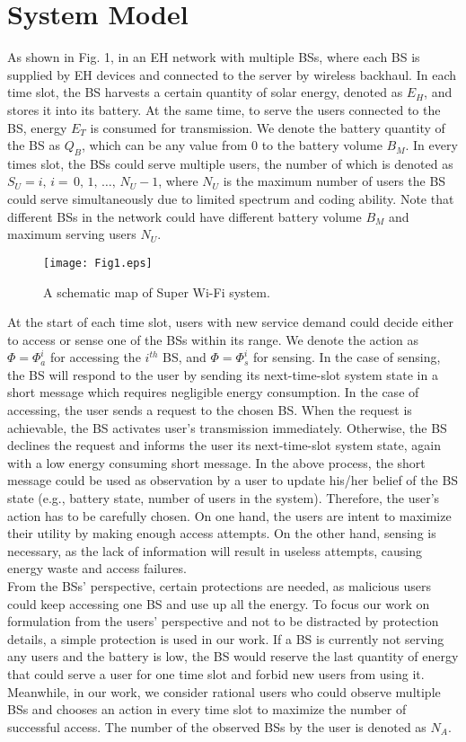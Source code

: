 \documentclass[journal,12pt,draftclsnofoot,onecolumn]{IEEEtran}
\begin{document}
\section{System Model}
As shown in Fig. 1, in an EH network with multiple BSs, where each BS is supplied by EH devices and connected to the server by wireless backhaul.
In each time slot, the BS harvests a certain quantity of solar energy,
denoted as \(E_H\), and stores it into its battery.
At the same time, to serve the users connected to the BS, energy \(E_T\) is consumed for transmission.
We denote the battery quantity of the BS as \(Q_B\),
which can be any value from \(0\) to the battery volume \(B_M\). In every times slot, the BSs could serve multiple users,
the number of which is denoted as \(S_U = i,\, i = \,0,\,1,\,\ldots,\,N_U-1\), where \(N_U\) is the maximum number of users the BS could serve simultaneously due to limited spectrum and coding ability. Note that different BSs in the network could have different battery volume \(B_M\) and maximum serving users \(N_U\).

\begin{figure}\label{fig1}
\centering
\texttt{[image: Fig1.eps]}
\caption{A schematic map of Super Wi-Fi system.}
\end{figure}
At the start of each time slot,
users with new service demand could decide either to access or sense one of the BSs within its range.
We denote the action as \(\Phi = \Phi_{a}^i\) for accessing the \(i^{th}\) BS,
and \(\Phi = \Phi_{s}^i\) for sensing.
In the case of sensing,
the BS will respond to the user by sending its next-time-slot system state
in a short message which requires negligible energy consumption.
In the case of accessing, the user sends a request to the chosen BS.
When the request is achievable, the BS activates user's transmission immediately.
Otherwise, the BS declines the request and
informs the user its next-time-slot system state, again with a low energy consuming short message.
In the above process, the short message could
be used as observation by a user to update his/her belief of the BS state (e.g., battery state, number of users in the system).
Therefore, the user's action has to be carefully chosen.
On one hand, the users are intent to maximize their utility by making enough access attempts.
On the other hand, sensing is necessary, as the lack of information will result in useless attempts, causing energy waste and access failures.\\
\indent
From the BSs' perspective, certain protections are needed,
as malicious users could keep accessing one BS and use up all the energy.
To focus our work on formulation from the users' perspective and
not to be distracted by protection details,
a simple protection is used in our work.
If a BS is currently not serving any users and the battery is low,
the BS would reserve the last quantity of energy that could serve a user
for one time slot and forbid new users from using it.
Meanwhile, in our work, we consider rational users who could observe multiple BSs and
chooses an action in every time slot to maximize the number of successful access.
The number of the observed BSs by the user is denoted as \(N_A\).
\end{document}
